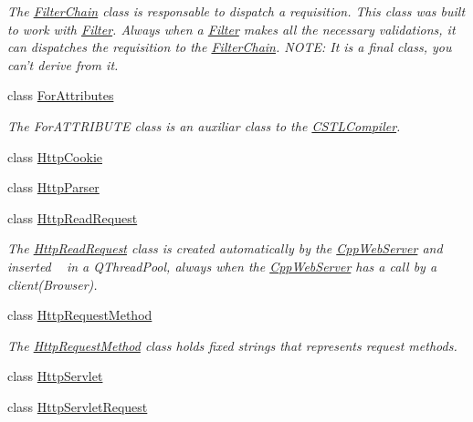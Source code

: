 \begin{DoxyCompactItemize}
\begin{DoxyCompactList}\small\item\em The \hyperlink{class_c_w_f_1_1_filter_chain}{Filter\+Chain} class is responsable to dispatch a requisition. This class was built to work with \hyperlink{class_c_w_f_1_1_filter}{Filter}. Always when a \hyperlink{class_c_w_f_1_1_filter}{Filter} makes all the necessary validations, it can dispatches the requisition to the \hyperlink{class_c_w_f_1_1_filter_chain}{Filter\+Chain}. N\+O\+T\+E\+: It is a final class, you can't derive from it. \end{DoxyCompactList}\item 
class \hyperlink{class_c_w_f_1_1_for_attributes}{For\+Attributes}
\begin{DoxyCompactList}\small\item\em The For\+A\+T\+T\+R\+I\+B\+U\+T\+E class is an auxiliar class to the \hyperlink{class_c_w_f_1_1_c_s_t_l_compiler}{C\+S\+T\+L\+Compiler}. \end{DoxyCompactList}\item 
class \hyperlink{class_c_w_f_1_1_http_cookie}{Http\+Cookie}
\item 
class \hyperlink{class_c_w_f_1_1_http_parser}{Http\+Parser}
\item 
class \hyperlink{class_c_w_f_1_1_http_read_request}{Http\+Read\+Request}
\begin{DoxyCompactList}\small\item\em The \hyperlink{class_c_w_f_1_1_http_read_request}{Http\+Read\+Request} class is created automatically by the \hyperlink{class_c_w_f_1_1_cpp_web_server}{Cpp\+Web\+Server} and inserted ~\newline
 in a Q\+Thread\+Pool, always when the \hyperlink{class_c_w_f_1_1_cpp_web_server}{Cpp\+Web\+Server} has a call by a client(\+Browser). \end{DoxyCompactList}\item 
class \hyperlink{class_c_w_f_1_1_http_request_method}{Http\+Request\+Method}
\begin{DoxyCompactList}\small\item\em The \hyperlink{class_c_w_f_1_1_http_request_method}{Http\+Request\+Method} class holds fixed strings that represents request methods. \end{DoxyCompactList}\item 
class \hyperlink{class_c_w_f_1_1_http_servlet}{Http\+Servlet}
\item 
class \hyperlink{class_c_w_f_1_1_http_servlet_request}{Http\+Servlet\+Request}

\end{DoxyCompactItemize}
